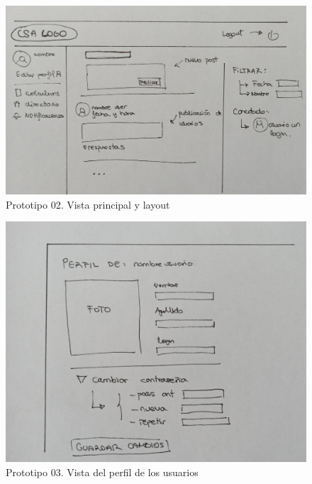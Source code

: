 \begin{figure}
    \centering
    \includegraphics[width=\linewidth]{img/PT02-Home.jpeg}
    \caption{Prototipo 02. Vista principal y layout}   
\end{figure}

\begin{figure}
    \centering
    \includegraphics[width=\linewidth]{img/PT03-Profile.jpeg}
    \caption{Prototipo 03. Vista del perfil de los usuarios}    
\end{figure}

